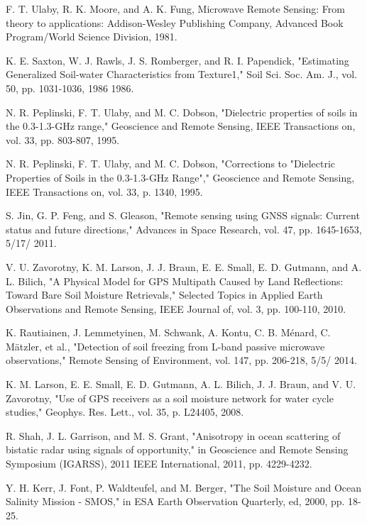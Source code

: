 \documentclass[draftcls]{IEEEtran}
\begin{document}
\begin{thebibliography}{1}

F. T. Ulaby, R. K. Moore, and A. K. Fung, Microwave Remote Sensing: From theory to applications: Addison-Wesley Publishing Company, Advanced Book Program/World Science Division, 1981.

K. E. Saxton, W. J. Rawls, J. S. Romberger, and R. I. Papendick, "Estimating Generalized Soil-water Characteristics from Texture1," Soil Sci. Soc. Am. J., vol. 50, pp. 1031-1036, 1986 1986.

N. R. Peplinski, F. T. Ulaby, and M. C. Dobson, "Dielectric properties of soils in the 0.3-1.3-GHz range," Geoscience and Remote Sensing, IEEE Transactions on, vol. 33, pp. 803-807, 1995.

N. R. Peplinski, F. T. Ulaby, and M. C. Dobson, "Corrections to "Dielectric Properties of Soils in the 0.3-1.3-GHz Range"," Geoscience and Remote Sensing, IEEE Transactions on, vol. 33, p. 1340, 1995.

S. Jin, G. P. Feng, and S. Gleason, "Remote sensing using GNSS signals: Current status and future directions," Advances in Space Research, vol. 47, pp. 1645-1653, 5/17/ 2011.

V. U. Zavorotny, K. M. Larson, J. J. Braun, E. E. Small, E. D. Gutmann, and A. L. Bilich, "A Physical Model for GPS Multipath Caused by Land Reflections: Toward Bare Soil Moisture Retrievals," Selected Topics in Applied Earth Observations and Remote Sensing, IEEE Journal of, vol. 3, pp. 100-110, 2010.

K. Rautiainen, J. Lemmetyinen, M. Schwank, A. Kontu, C. B. Ménard, C. Mätzler, et al., "Detection of soil freezing from L-band passive microwave observations," Remote Sensing of Environment, vol. 147, pp. 206-218, 5/5/ 2014.

K. M. Larson, E. E. Small, E. D. Gutmann, A. L. Bilich, J. J. Braun, and V. U. Zavorotny, "Use of GPS receivers as a soil moisture network for water cycle studies," Geophys. Res. Lett., vol. 35, p. L24405, 2008.

R. Shah, J. L. Garrison, and M. S. Grant, "Anisotropy in ocean scattering of bistatic radar using signals of opportunity," in Geoscience and Remote Sensing Symposium (IGARSS), 2011 IEEE International, 2011, pp. 4229-4232.

Y. H. Kerr, J. Font, P. Waldteufel, and M. Berger, "The Soil Moisture and Ocean Salinity Mission - SMOS," in ESA Earth Observation Quarterly, ed, 2000, pp. 18-25.


\end{thebibliography}
\end{document}
